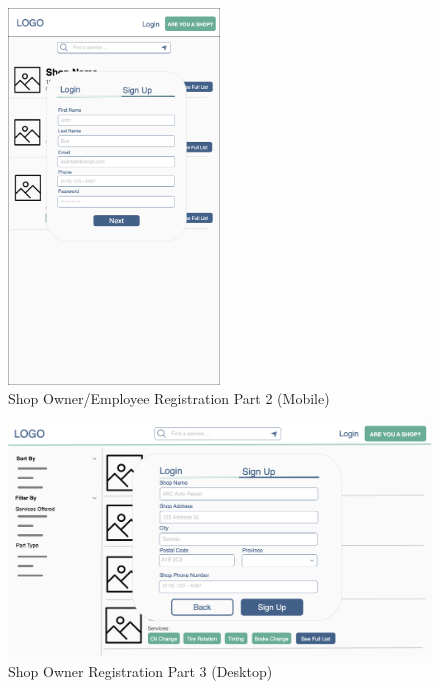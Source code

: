 \documentclass[12pt, titlepage]{article}
\begin{document}
\begin{figure}[H]
	\centering
	\includegraphics[width=0.5\textwidth]{mockups/Shop Sign Up (Part 1) (Mobile).png}
	\caption{Shop Owner/Employee Registration \textemdash{} Part 2 (Mobile)}
\end{figure}

\begin{figure}[H]
	\centering
	\includegraphics[width=\textwidth]{mockups/Shop Owner Signup (Part 2) (Desktop).png}
	\caption{Shop Owner Registration \textemdash{} Part 3 (Desktop)}
\end{figure}
\end{document}
